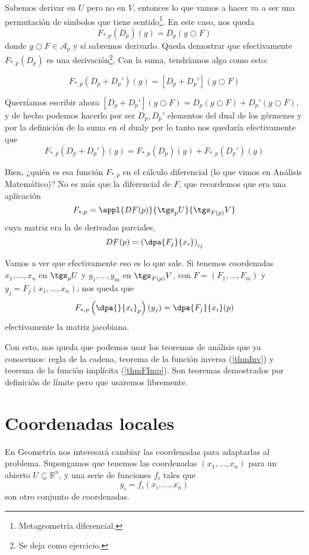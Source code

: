 Sabemos derivar en $U$ pero no en $V$, entonces lo que vamos a hacer va a ser una permutación de símbolos que tiene sentido\footnote{Metageometría diferencial.}. En este caso, nos queda \[ F_{*,p}(D_p)(g) = D_p (g ○ F)\] donde $g ○ F ∈ \mathcal{A}_p$ y sí sabremos derivarlo. Queda demostrar que efectivamente $F_{*,p}(D_p)$ es una derivación\footnote{Se deja como ejercicio.}. Con la suma, tendríamos algo como esto:

\[ F_{*,p}(D_p + D_p')(g) = [D_p + D_p'](g○F) \]

Querríamos escribir ahora  $[D_p + D_p'](g○F) = D_p (g○F) + D_p'(g○F)$, y de hecho podemos hacerlo por ser $D_p, D_p'$ elementos del dual de los gérmenes y por la definición de la suma en el dual\footnotemark y por lo tanto nos quedaría efectivamente que \[ F_{*,p}(D_p + D_p')(g) = F_{*,p}(D_p)(g) + F_{*,p}(D_p')(g) \]


Bien, ¿quién es esa función $F_{*,p}$ en el cálculo diferencial (lo que vimos en Análisis Matemático)? No es más que la diferencial de $F$, que recordemos que era una aplicación \[ F_{*,p} = \appl{DF(p)}{\tgs_p U} {\tgs_{F(p)}V}\] cuya matriz era la de derivadas parciales, \[ DF(p) = \left(\dpa{F_j}{x_i}\right)_{ij} \]

Vamos a ver que efectivamente eso es lo que sale. Si tenemos coordenadas $x_1, \dotsc, x_n$ en $\tgs_pU$ y $y_1, \dotsc, y_m$ en $\tgs_{F(p)} V$, con $F = (F_1, \dotsc, F_m)$ y $y_j = F_j (x_1, \dotsc, x_n)$; nos queda que \[ F_{*, p} \left(\dpa{}{x_i}_p\right)(y_j) = \dpa{F_j}{x_i} (p) \] efectivamente la matriz jacobiana.

Con esto, nos queda que podemos usar los teoremas de análisis que ya conocemos: regla de la cadena, teorema de la función inversa (\ref{thmInv}) y teorema de la función implícita (\ref{thmFImp}). Son teoremas demostrados por definición de límite pero que usaremos libremente.

\section{Coordenadas locales}

En Geometría nos interesará cambiar las coordenadas para adaptarlas al problema. Supongamos que tenemos las coordenadas $(x_1, \dotsc, x_n)$ para un abierto $U⊆ℝ^n$, y una serie de funciones $f_i$ tales que \[ y_i = f_i(x_i, \dotsc, x_n)\] son otro conjunto de coordenadas.

